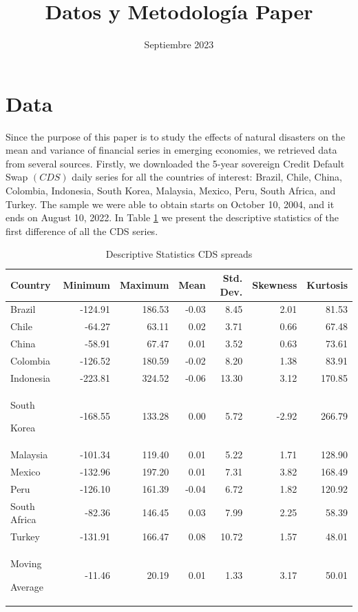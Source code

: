 \documentclass{article}
\title{Datos y Metodología Paper}
\author{}
\date{Septiembre 2023}
\begin{document}
\maketitle

\section{Data}
Since the purpose of this paper is to study the effects of natural disasters on the mean and variance 
of financial series in emerging economies, we retrieved data from several sources. Firstly, we 
downloaded the 5-year sovereign Credit Default Swap $(CDS)$ daily series for all the countries of 
interest: Brazil, Chile, China, Colombia, Indonesia, South Korea, Malaysia, Mexico, Peru, South Africa, and Turkey. 
The sample we were able to obtain starts on October 10, 2004, and it ends on August 10, 2022. In Table \ref{table:CDS}
 we present the descriptive statistics of the first difference of all the CDS series. \\
\begin{table}[H]
\centering
\small
\begin{tabularx}{\textwidth}{Xrrrrrr}
  \hline
Country & Minimum & Maximum & Mean & Std. Dev. & Skewness & Kurtosis \\ 
  \hline
Brazil & -124.91 & 186.53 & -0.03 & 8.45 & 2.01 & 81.53 \\ 
  Chile & -64.27 & 63.11 & 0.02 & 3.71 & 0.66 & 67.48 \\ 
  China & -58.91 & 67.47 & 0.01 & 3.52 & 0.63 & 73.61 \\ 
  Colombia & -126.52 & 180.59 & -0.02 & 8.20 & 1.38 & 83.91 \\ 
  Indonesia & -223.81 & 324.52 & -0.06 & 13.30 & 3.12 & 170.85 \\ 
  South \par Korea & -168.55 & 133.28 & 0.00 & 5.72 & -2.92 & 266.79 \\ 
  Malaysia & -101.34 & 119.40 & 0.01 & 5.22 & 1.71 & 128.90 \\ 
  Mexico & -132.96 & 197.20 & 0.01 & 7.31 & 3.82 & 168.49 \\ 
  Peru & -126.10 & 161.39 & -0.04 & 6.72 & 1.82 & 120.92 \\ 
  South Africa & -82.36 & 146.45 & 0.03 & 7.99 & 2.25 & 58.39 \\ 
  Turkey & -131.91 & 166.47 & 0.08 & 10.72 & 1.57 & 48.01 \\ 
  Moving \par Average & -11.46 & 20.19 & 0.01 & 1.33 & 3.17 & 50.01 \\ 
   \hline
\end{tabularx}
\caption{Descriptive Statistics CDS spreads}
\label{table:CDS}
\end{table}
\end{document}
